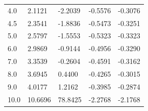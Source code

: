 {\begin{tabular}{ m{6em} m{6em}  m{6em}  m{6em} m{6em} }
        4.0 & 2.1121 & -2.2039 & -0.5576 & -0.3076 \\
        4.5 & 2.3541 & -1.8836 & -0.5473 & -0.3251 \\
        5.0 & 2.5797 & -1.5553 & -0.5323 & -0.3323 \\
        6.0 & 2.9869 & -0.9144 & -0.4956 & -0.3290 \\
        7.0 & 3.3539 & -0.2604 & -0.4591 & -0.3162 \\
        8.0 & 3.6945 & 0.4400 & -0.4265 & -0.3015 \\
        9.0 & 4.0177 & 1.2162 & -0.3985 & -0.2874 \\
        10.0 & 10.6696 & 78.8425 & -2.2768 & -2.1768 \\
      \hline
      \end{tabular}

}
